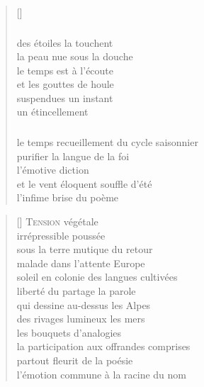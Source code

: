 \documentclass[a4paper, titlepage, twoside, 12pt]{book}
\begin{document}
\begin{verse}[\versewidth]
\subsubsection*{}
des étoiles la touchent\\
la peau nue sous la douche\\
le temps est à l'écoute\\
et les gouttes de houle\\
suspendues un instant\\
un étincellement
\subsubsection*{}
le temps recueillement du cycle saisonnier\\
purifier la langue de la foi\\
l'émotive diction\\
et le vent éloquent souffle d'été\\
l'infime brise du poème

\end{verse}


\newpage


\vspace*{2cm}
\settowidth{\versewidth}{qui dessine noir au-dessus les Alpes}
\begin{verse}[\versewidth]
{\lettrine[lines=1]{\textcolor[gray]{0.6}{T}}{\space ension} végétale}\\
irrépressible poussée\\
sous la terre mutique du retour\\
malade dans l'attente Europe\\
soleil en colonie des langues cultivées\\
liberté du partage la parole\\
qui dessine au-dessus les Alpes\\
des rivages lumineux les mers\\
les bouquets d'analogies\\
la participation aux offrandes comprises\\
partout fleurit de la poésie\\
l'émotion commune à la racine du nom 

\end{verse}



\vspace*{1.5cm}
\begin{center}
\LARGE{\aldineleft}
\end{center}  
\end{document}
